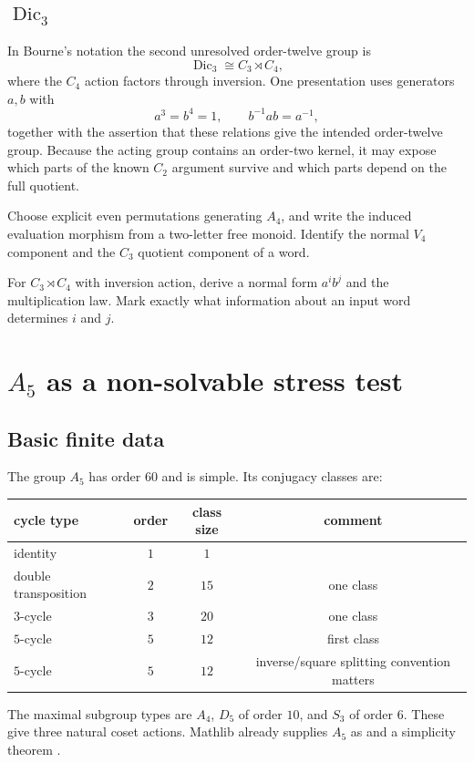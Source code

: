 \documentclass{amsart}
\begin{document}
\subsection{$\operatorname{Dic}_3$}

In Bourne's notation the second unresolved order-twelve group is
\[
  \operatorname{Dic}_3\cong C_3\rtimes C_4,
\]
where the $C_4$ action factors through inversion.  One presentation uses generators $a,b$ with
\[
  a^3=b^4=1,\qquad b^{-1}ab=a^{-1},
\]
together with the assertion that these relations give the intended order-twelve group.  Because the acting group contains an order-two kernel, it may expose which parts of the known $C_2$ argument survive and which parts depend on the full quotient.

\begin{exercise}
Choose explicit even permutations generating $A_4$, and write the induced evaluation morphism from a two-letter free monoid.  Identify the normal $V_4$ component and the $C_3$ quotient component of a word.
\end{exercise}

\begin{exercise}
For $C_3\rtimes C_4$ with inversion action, derive a normal form $a^i b^j$ and the multiplication law.  Mark exactly what information about an input word determines $i$ and $j$.
\end{exercise}

\section{$A_5$ as a non-solvable stress test}

\subsection{Basic finite data}

The group $A_5$ has order $60$ and is simple.  Its conjugacy classes are:
\begin{center}
\begin{tabular}{@{}lccc@{}}
\toprule
cycle type & order & class size & comment\\
\midrule
identity & $1$ & $1$ & \\
double transposition & $2$ & $15$ & one class\\
$3$-cycle & $3$ & $20$ & one class\\
$5$-cycle & $5$ & $12$ & first class\\
$5$-cycle & $5$ & $12$ & inverse/square splitting convention matters\\
\bottomrule
\end{tabular}
\end{center}
The maximal subgroup types are $A_4$, $D_5$ of order $10$, and $S_3$ of order $6$.  These give three natural coset actions.  Mathlib already supplies $A_5$ as  and a simplicity theorem \cite{mathlibAlternating2026}.
\end{document}
